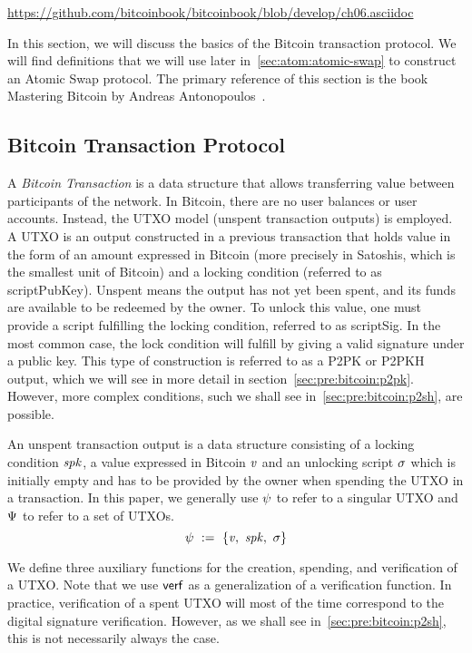\urldef\urlbtcbook\url{https://github.com/bitcoinbook/bitcoinbook/blob/develop/ch06.asciidoc}

In this section, we will discuss the basics of the Bitcoin transaction protocol.
We will find definitions that we will use later in~\cref{sec:atom:atomic-swap} to construct an Atomic Swap protocol.
The primary reference of this section is the book Mastering Bitcoin by Andreas Antonopoulos~\cite{antonopoulos2014mastering}.

\subsection{Bitcoin Transaction Protocol}\label{subsec:pre:bitcointx}

A \emph{Bitcoin Transaction} is a data structure that allows transferring value between participants of the network.
In Bitcoin, there are no user balances or user accounts.
Instead, the UTXO model (unspent transaction outputs) is employed.
A UTXO is an output constructed in a previous transaction that holds value in the form of an amount expressed in
Bitcoin (more precisely in Satoshis, which is the smallest unit of Bitcoin) and a locking condition (referred to as
scriptPubKey).
Unspent means the output has not yet been spent, and its funds are available to be redeemed by the owner.
To unlock this value, one must provide a script fulfilling the locking condition, referred to as scriptSig.
In the most common case, the lock condition will fulfill by giving a valid signature under a public key.
This type of construction is referred to as a P2PK or P2PKH output, which we will see in more detail in section~\cref{sec:pre:bitcoin:p2pk}.
However, more complex conditions, such we shall see in~\cref{sec:pre:bitcoin:p2sh}, are possible.

\begin{definition} An unspent transaction output is a data structure consisting of a locking condition $\mathit{spk}$, a value expressed in Bitcoin $\mathit{v}$ and an unlocking script $\mathit{\sigma}$ which is initially empty and has to be provided by the owner when spending the UTXO in a transaction.
In this paper, we generally use $\psi$ to refer to a singular UTXO and $\Psi$ to refer to a set of UTXOs.
    \[ \psi ~:=~ \{ \mathit{v} ,~ \mathit{spk} ,~ \mathit{\sigma} \} \]
\end{definition}

We define three auxiliary functions for the creation, spending, and verification of a UTXO.
Note that we use $\mathsf{verf}$ as a generalization of a verification function.
In practice, verification of a spent UTXO will most of the time correspond to the digital signature verification.
However, as we shall see in~\cref{sec:pre:bitcoin:p2sh}, this is not necessarily always the case.

